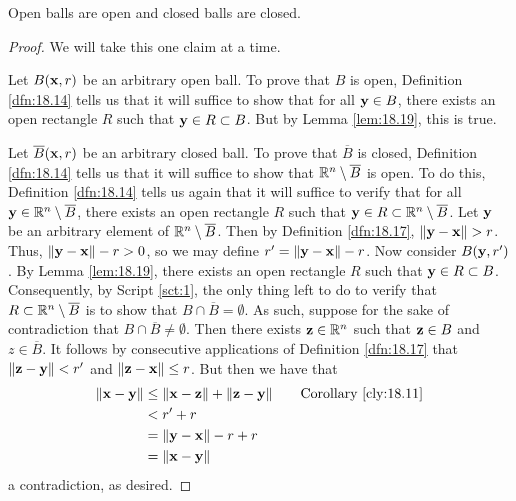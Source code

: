 \documentclass[../main.tex]{subfiles}
\begin{document}
\begin{corollary}\label{cly:18.21}
    Open balls are open and closed balls are closed.
    \begin{proof}
        We will take this one claim at a time.\par\smallskip
        Let $B(\mathbf{x},r)$ be an arbitrary open ball. To prove that $B$ is open, Definition \ref{dfn:18.14} tells us that it will suffice to show that for all $\mathbf{y}\in B$, there exists an open rectangle $R$ such that $\mathbf{y}\in R\subset B$. But by Lemma \ref{lem:18.19}, this is true.\par
        Let $\overline{B}(\mathbf{x},r)$ be an arbitrary closed ball. To prove that $\overline{B}$ is closed, Definition \ref{dfn:18.14} tells us that it will suffice to show that $\mathbb{R}^n\setminus\overline{B}$ is open. To do this, Definition \ref{dfn:18.14} tells us again that it will suffice to verify that for all $\mathbf{y}\in\mathbb{R}^n\setminus\overline{B}$, there exists an open rectangle $R$ such that $\mathbf{y}\in R\subset\mathbb{R}^n\setminus\overline{B}$. Let $\mathbf{y}$ be an arbitrary element of $\mathbb{R}^n\setminus\overline{B}$. Then by Definition \ref{dfn:18.17}, $\norm{\mathbf{y}-\mathbf{x}}>r$. Thus, $\norm{\mathbf{y}-\mathbf{x}}-r>0$, so we may define $r'=\norm{\mathbf{y}-\mathbf{x}}-r$. Now consider $B(\mathbf{y},r')$. By Lemma \ref{lem:18.19}, there exists an open rectangle $R$ such that $\mathbf{y}\in R\subset B$. Consequently, by Script \ref{sct:1}, the only thing left to do to verify that $R\subset\mathbb{R}^n\setminus\overline{B}$ is to show that $B\cap\overline{B}=\emptyset$. As such, suppose for the sake of contradiction that $B\cap\overline{B}\neq\emptyset$. Then there exists $\mathbf{z}\in\mathbb{R}^n$ such that $\mathbf{z}\in B$ and $z\in\overline{B}$. It follows by consecutive applications of Definition \ref{dfn:18.17} that $\norm{\mathbf{z}-\mathbf{y}}<r'$ and $\norm{\mathbf{z}-\mathbf{x}}\leq r$. But then we have that
        \begin{align*}
            \norm{\x-\y} &\leq \norm{\x-\z}+\norm{\z-\y}\tag*{Corollary \ref{cly:18.11}}\\
            &< r'+r\\
            &= \norm{\y-\x}-r+r\\
            &= \norm{\x-\y}
        \end{align*}
        a contradiction, as desired.
    \end{proof}
\end{corollary}
\end{document}
